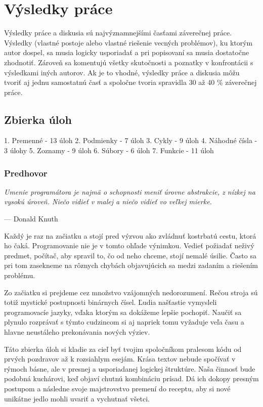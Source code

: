 \chapter{Výsledky práce}
Výsledky práce a diskusia sú najvýznamnejšími časťami záverečnej práce. Výsledky (vlastné postoje alebo vlastné riešenie vecných problémov), ku ktorým autor dospel, sa musia logicky usporiadať a pri popisovaní sa musia dostatočne zhodnotiť. Zároveň sa komentujú všetky skutočnosti a poznatky v konfrontácii s výsledkami iných autorov. Ak je to vhodné, výsledky práce a diskusia môžu tvoriť aj jednu samostatnú časť a spoločne tvoria spravidla 30 až 40 \% záverečnej práce.

\section{Zbierka úloh}

1. Premenné - 13 úloh
2. Podmienky - 7 úloh
3. Cykly - 9 úloh
4. Náhodné čísla - 3 úlohy
5. Zoznamy - 9 úloh
6. Súbory - 6 úloh
7. Funkcie - 11 úloh

\subsection{Predhovor}
\setlength\epigraphwidth{14cm}
\setlength\epigraphrule{0pt}
\epigraph{\small\itshape Umenie programátora je najmä o schopnosti meniť úrovne abstrakcie, z nízkej na vysokú úroveň. Niečo vidieť v malej a niečo vidieť vo veľkej mierke.}{--- \textup{Donald Knuth}}

Každý je raz na začiatku a stojí pred výzvou ako zvládnuť kostrbatú cestu, ktorá ho čaká.  Programovanie nie je v tomto ohľade výnimkou. Vedieť požiadať neživý predmet, počítač, aby  spravil to, čo od neho chceme, stojí nemalé úsilie. Často sa pri tom zasekneme na rôznych  chybách objavujúcich sa medzi zadaním a riešením problému. 

Zo začiatku si prejdeme cez množstvo vzájomných nedorozumení. Rečou stroja sú totiž mystické  postupnosti binárnych čísel. Ľudia našťastie vymysleli programovacíe jazyky, vďaka ktorým sa  dokážeme lepšie pochopiť. Naučiť sa plynulo rozprávať s týmto cudzincom si aj napriek tomu  vyžaduje veľa času a hlavne neustáleho prekonávania nových výziev.

Táto zbierka úloh si kladie za cieľ byť tvojim spoločníkom pralesom kódu od prvých pozdravov až k rozsiahlym esejám. Krása textov nebude spočívať v rýmoch básne, ale v presnej a usporiadanej logickej štruktúre. Naša činnosť bude podobná kuchárovi, keď objaví chutnú kombináciu prísad. Dá ich dokopy presným postupom a následne svoje majstrovstvo premení do receptu, aby si nové unikátne jedlo mohli uvariť a vychutnať všetci.

